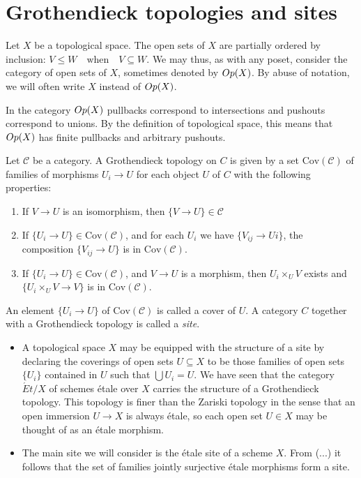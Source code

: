 \section{Grothendieck topologies and sites}
\begin{construction}[h]\label{def:opens}
  Let $X$ be a topological space. The open sets of $X$ are partially ordered by inclusion: $V \le W \quad \text{when} \quad V \subseteq W$.  We may thus, as with any poset, consider the category of open sets of $X$, sometimes denoted by $Op(X)$. By abuse of notation, we will often write $X$ instead of $Op(X)$.
\end{construction}
\begin{remark}
  In the category $Op(X)$ pullbacks correspond to intersections and pushouts correspond to unions. By the definition of topological space, this means that $Op(X)$ has finite pullbacks and arbitrary pushouts. 
\end{remark}

\begin{definition}
	Let $\mathcal{C}$ be a category. A Grothendieck topology on $C$ is given by a set $\text{Cov}(\mathcal{C})$ of families of morphisms ${U_i \to U}$ for each object $U$ of $C$ with the following properties:
	\begin{enumerate}
		\item If $V \to U$ is an isomorphism, then $\{V \to U\} \in \mathcal{C}$
		\item If $\{U_i \to U\} \in \text{Cov}(\mathcal{C})$, and for each $U_i$ we have $\{V_{ij} \to Ui\}$, the composition $\{V_{ij} \to U\}$ is in $\text{Cov}(\mathcal{C})$.
		\item If $\{U_i \to U\} \in \text{Cov}(\mathcal{C})$, and $V \to U$ is a morphism, then $U_i \times_U V$ exists and 
		$\{U_i \times_U V \to V\}$ is in $\text{Cov}(\mathcal{C})$.
	\end{enumerate}	
	An element $\{U_i \to U\}$ of $\text{Cov}(\mathcal{C})$ is called a cover of $U$. A category $C$ together with a Grothendieck topology is called a \textit{site}.
\end{definition}

\begin{itemize}
	\item	A topological space $X$ may be equipped with the structure of a site by declaring the coverings of open sets $U \subseteq X$ to be those families of open sets $\{U_i\}$ contained in $U$ such that $\bigcup U_i = U$. We have seen that the category $\acute{E}t/X$ of schemes \'etale over $X$ carries the structure of a Grothendieck topology. This topology is finer than the Zariski topology in the sense that an open immersion $U \to X$ is always \'etale, so each open set $U \in X$ may be thought of as an \'etale morphism.
	\item The main site we will consider is the \'etale site of a scheme $X$. From (...) it follows that the set of families jointly surjective \'etale morphisms form a site.
\end{itemize}


